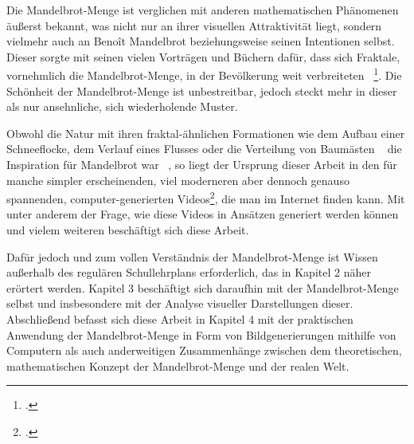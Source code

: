 
Die Mandelbrot-Menge ist verglichen mit anderen mathematischen Phänomenen
äußerst bekannt, was nicht nur an ihrer visuellen Attraktivität liegt,
sondern vielmehr auch an Benoît Mandelbrot beziehungsweise seinen Intentionen selbst.
Dieser sorgte mit seinen vielen Vorträgen und Büchern dafür, dass sich Fraktale,
vornehmlich die Mandelbrot-Menge, in der Bevölkerung weit verbreiteten
~\footcite[Vgl. letzten Absatz]{ibm_fractal_2011}.
Die Schönheit der Mandelbrot-Menge ist unbestreitbar, jedoch steckt mehr in dieser
als nur ansehnliche, sich wiederholende Muster.

Obwohl die Natur mit ihren fraktal-ähnlichen Formationen wie dem Aufbau einer
Schneeflocke, dem Verlauf eines Flusses oder die Verteilung von Baumästen
~\cite{nnart_fractals_nodate} die Inspiration für Mandelbrot war
~\cite{zink_kosmische_2014}, so liegt der Ursprung dieser Arbeit in den für
manche simpler erscheinenden, viel moderneren aber dennoch genauso spannenden,
computer-generierten Videos\footcite[Vgl. bspw.][]{maths_town_eye_2017},
die man im Internet finden kann.
Mit unter anderem der Frage, wie diese Videos in Ansätzen generiert werden können
und vielem weiteren beschäftigt sich diese Arbeit.

Dafür jedoch und zum vollen Verständnis der Mandelbrot-Menge ist Wissen außerhalb
des regulären Schullehrplans erforderlich, das in Kapitel 2 näher erörtert werden.
Kapitel 3 beschäftigt sich daraufhin mit der Mandelbrot-Menge selbst und insbesondere
mit der Analyse visueller Darstellungen dieser.
Abschließend befasst sich diese Arbeit in Kapitel 4 mit der praktischen Anwendung
der Mandelbrot-Menge in Form von Bildgenerierungen mithilfe von Computern als auch
anderweitigen Zusammenhänge zwischen dem theoretischen, mathematischen Konzept
der Mandelbrot-Menge und der realen Welt.